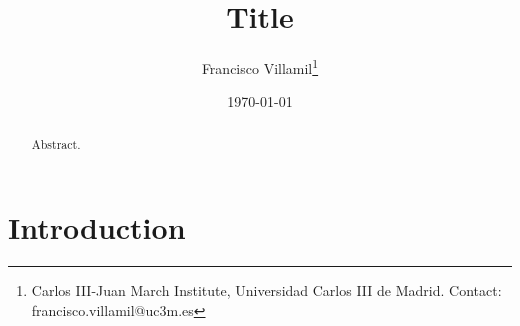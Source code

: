 \documentclass[12pt, notitlepage]{article}
\title{\Large Title}
\author{Francisco Villamil\footnote{Carlos III-Juan March Institute, Universidad Carlos III de Madrid. Contact: francisco.villamil@uc3m.es}}
\date{\today}
\begin{document}
\maketitle
\thispagestyle{empty}

\vspace{30pt}

\begin{abstract}

Abstract.

\end{abstract}

\newpage
\setcounter{page}{1}
\section*{Introduction}





% 
\end{document}
